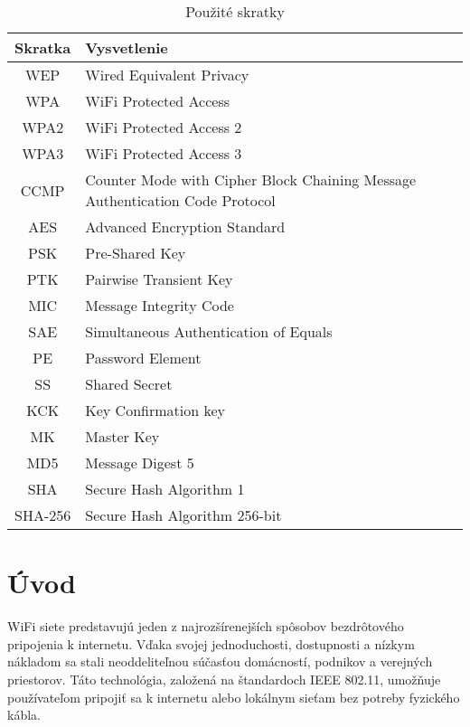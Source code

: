 \documentclass[12pt, twoside]{book}
\begin{document}
\newpage
\begin{table}[H]
\begin{center}
\renewcommand\thetable{1}
\caption{Použité skratky}
\begin{tabular}{ |c|C{10cm}| } 
 \hline
\textbf{Skratka} & \textbf{Vysvetlenie} 
 \\ \hline
WEP  & Wired Equivalent Privacy
\\ \hline
WPA  & WiFi Protected Access
\\ \hline
WPA2  & WiFi Protected Access 2
\\ \hline
WPA3  & WiFi Protected Access 3
\\ \hline
CCMP  & Counter Mode with Cipher Block Chaining Message Authentication Code Protocol
\\ \hline
AES  & Advanced Encryption Standard
\\ \hline
PSK  & Pre-Shared Key
\\ \hline
PTK & Pairwise Transient Key
\\ \hline
MIC & Message Integrity Code
\\ \hline
SAE & Simultaneous Authentication of Equals
\\ \hline
PE  & Password Element
\\ \hline
SS  & Shared Secret
\\ \hline
KCK  & Key Confirmation key
\\ \hline
MK  & Master Key
\\ \hline
MD5 & Message Digest 5
\\ \hline
SHA & Secure Hash Algorithm 1
\\ \hline
SHA-256 & Secure Hash Algorithm 256-bit
\\ \hline
\end{tabular}
\end{center}
\end{table}




\newpage

\pagestyle{fancy}
\setcounter{page}{1}

\fancyhf{} 
\renewcommand{\headrulewidth}{0pt}
\fancyfoot[C]{\thepage}
\renewcommand\thesection{\arabic{section}}


\section{Úvod}
WiFi siete predstavujú jeden z najrozšírenejších spôsobov bezdrôtového pripojenia k internetu. Vďaka svojej jednoduchosti, dostupnosti a nízkym nákladom sa stali neoddeliteľnou súčasťou domácností, podnikov a verejných priestorov. Táto technológia, založená na štandardoch IEEE 802.11, umožňuje používateľom pripojiť sa k internetu alebo lokálnym sieťam bez potreby fyzického kábla.
\end{document}
